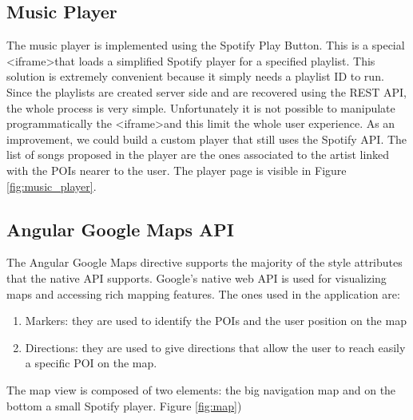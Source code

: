 \documentclass[paper=a4, fontsize=11pt]{scrartcl}
\begin{document}
\subsection{Music Player}
The music player is implemented using the Spotify Play Button. This is a special \textless{}iframe\textgreater that loads a simplified Spotify player for a specified playlist. This solution is extremely convenient because it simply needs a playlist ID to run. Since the playlists are created server side and are recovered using the REST API, the whole process is very simple.
Unfortunately it is not possible to manipulate programmatically the \textless{}iframe\textgreater and this limit the whole user experience. As an improvement, we could build a custom player that still uses the Spotify API.
The list of songs proposed in the player are the ones associated to the artist linked with the POIs nearer to the user.
The player page is visible in Figure \ref{fig:music_player}.

\subsection{Angular Google Maps API}
The Angular Google Maps directive supports the majority of the style attributes that the native API supports. Google’s native web API is used for visualizing maps and accessing rich mapping features. The ones used in the application are:

\begin{enumerate}
\item Markers: they are used to identify the POIs and the user position on the map
\item Directions: they are used to give directions that allow the user to reach easily a specific POI on the map.
\end{enumerate}

The map view is composed of two elements: the big navigation map and on the bottom a small Spotify player. Figure \ref{fig:map})
\end{document}
